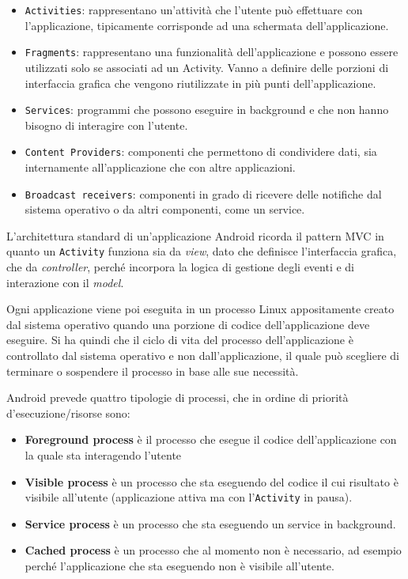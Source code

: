 \begin{itemize}
	\item \texttt{Activities}: rappresentano un'attività che l'utente può
		effettuare con l'applicazione, tipicamente corrisponde ad una
		schermata dell'applicazione.
	\item \texttt{Fragments}: rappresentano una funzionalità dell'applicazione e
		possono essere utilizzati solo se associati ad un Activity. Vanno a
		definire delle porzioni di interfaccia grafica che vengono
		riutilizzate in più punti dell'applicazione.
	\item \texttt{Services}: programmi che possono eseguire in background e che
		non hanno bisogno di interagire con l'utente.
	\item \texttt{Content Providers}: componenti che permettono di condividere
		dati, sia internamente all'applicazione che con altre applicazioni.
	\item \texttt{Broadcast receivers}: componenti in grado di ricevere delle
		notifiche dal sistema operativo o da altri componenti, come un
		service.
\end{itemize}

L'architettura standard di un'applicazione Android ricorda il pattern
MVC in quanto un \texttt{Activity} funziona sia da \textit{view}, dato che definisce
l'interfaccia grafica, che da \textit{controller}, perché incorpora la logica
di gestione degli eventi e di interazione con il \textit{model}.

Ogni applicazione viene poi eseguita in un processo Linux appositamente
creato dal sistema operativo quando una porzione di codice
dell'applicazione deve eseguire.
Si ha quindi che il ciclo di vita del processo dell'applicazione è
controllato dal sistema operativo e non dall'applicazione, il quale può
scegliere di terminare o sospendere il processo in base alle sue
necessità.

Android prevede quattro tipologie di processi, che in ordine di priorità
d'esecuzione/risorse sono:

\begin{itemize}
	\item \textbf{Foreground process} è il processo che esegue il codice
		dell'applicazione con la quale sta interagendo l'utente
	\item \textbf{Visible process} è un processo che sta eseguendo del codice il
		cui risultato è visibile all'utente (applicazione attiva ma con
		l'\texttt{Activity} in pausa).
	\item \textbf{Service process} è un processo che sta eseguendo un service in
		background.
	\item \textbf{Cached process} è un processo che al momento non è necessario,
		ad esempio perché l'applicazione che sta eseguendo non è visibile
		all'utente.
\end{itemize}

